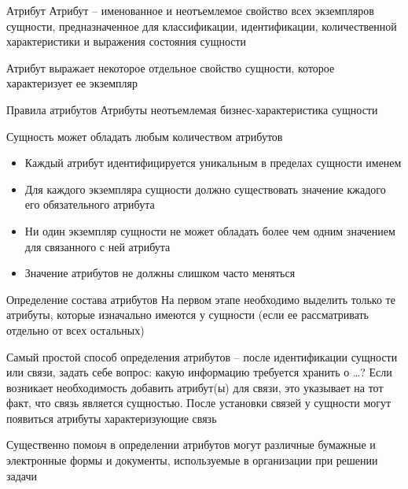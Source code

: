\documentclass[12pt]{article}
\begin{document}
\begin{defin}{Атрибут}
    Атрибут -- именованное и неотъемлемое свойство всех экземпляров сущности, предназначенное для классификации, идентификации, количественной характеристики и выражения состояния сущности 

    Атрибут выражает некоторое отдельное свойство сущности, которое характеризует ее экземпляр 
\end{defin}

\begin{nota}{Правила атрибутов}
    Атрибуты неотъемлемая бизнес-характеристика сущности 

    Сущность может обладать любым количеством атрибутов

    \begin{itemize}
        \item Каждый атрибут идентифицируется уникальным в пределах сущности именем 
        \item Для каждого экземпляра сущности должно существовать значение кжадого его обязательного атрибута 
        \item Ни один экземпляр сущности не может обладать более чем одним значением для связанного с ней атрибута 
        \item Значение атрибутов не должны слишком часто меняться 
    \end{itemize}
\end{nota}

\begin{nota}{Определение состава атрибутов}
    На первом этапе необходимо выделить только те атрибуты, которые изначально имеются у сущности (если ее рассматривать отдельно от всех остальных)

    Самый простой способ определения атрибутов -- после идентификации сущности или связи, задать себе вопрос: какую информацию требуется хранить о \dots? Если возникает необходимость добавить атрибут(ы) для связи, это указывает на тот факт, что связь является сущностью. После установки связей у сущности могут появиться атрибуты характеризующие связь 

    Существенно помоьч в определении атрибутов могут различные бумажные и электронные формы и документы, используемые в организации при решении задачи
\end{nota}
\end{document}
